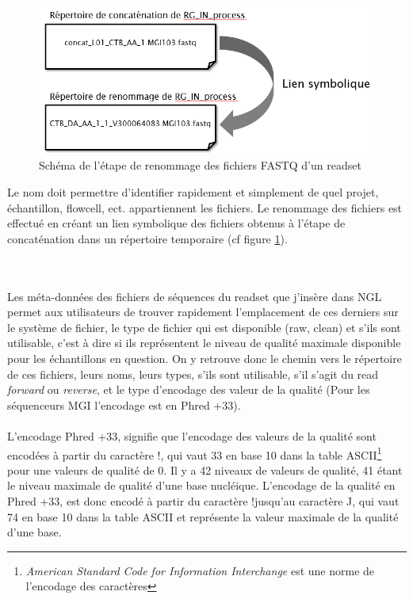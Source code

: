 \begin{minipage}{0.45\textwidth}
    \begin{figure}[H]
        \centering
        \includegraphics[width=1\textwidth]{img/Schema-renomage-fastq.png}
        \caption{\footnotesize{Schéma de l'étape de renommage des fichiers FASTQ d'un readset}}
        \label{schema-rename-fastq}
    \end{figure}
\end{minipage}
\hfill
\begin{minipage}{0.45\textwidth}
    Le nom doit permettre d'identifier rapidement et simplement de quel projet, échantillon, flowcell, ect. appartiennent les fichiers.
    Le renommage des fichiers est effectué en créant un lien symbolique des fichiers obtenus à l'étape de \og concaténation\fg{} dans un répertoire temporaire (cf figure \ref{schema-rename-fastq}).
\end{minipage}\\\\

Les méta-données des fichiers de séquences du readset que j'insère dans NGL permet aux utilisateurs de trouver rapidement l'emplacement de ces derniers sur le système de fichier, le type de fichier qui est disponible (\og raw\fg{}, \og clean\fg{}) et s'ils sont \og utilisable\fg{}, c'est à dire si ils représentent le niveau de qualité maximale disponible pour les échantillons en question.
On y retrouve donc le chemin vers le répertoire de ces fichiers, leurs noms, leurs types, s'ils sont utilisable, s'il s'agit du read \emph{forward} ou \emph{reverse}, et le type d'encodage des valeur de la qualité (Pour les séquenceurs MGI l'encodage est en Phred +33).\\\\

L'encodage Phred +33, signifie que l'encodage des valeurs de la qualité sont encodées à partir du caractère \og !\fg{}, qui vaut 33 en base 10 dans la table ASCII\footnote{\emph{American Standard Code for Information Interchange} est une norme de l'encodage des caractères} pour une valeurs de qualité de 0. Il y a 42 niveaux de valeurs de qualité, 41 étant le niveau maximale de qualité d'une base nucléique. L'encodage de la qualité en Phred +33, est donc encodé à partir du caractère \og !\fg jusqu'au caractère \og J\fg{}, qui vaut 74 en base 10 dans la table ASCII et représente la valeur maximale de la qualité d'une base.\\

